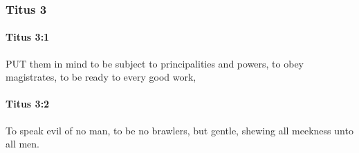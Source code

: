 	\subsubsection{Titus 3} %
		\label{TITUS-3}
		
		\paragraph{Titus 3:1} %
			\label{TITUS-3-1}

			PUT them in mind to be subject to principalities and powers, to obey magistrates, to be ready to every good work,

			\begin{framed}
			\scriptsize
				\begin{compactdesc}
					\item[SBLG] 
				\end{compactdesc}
			\end{framed}

		\paragraph{Titus 3:2} %
			\label{TITUS-3-2}

			To speak evil of no man, to be no brawlers, but gentle, shewing all meekness unto all men.

